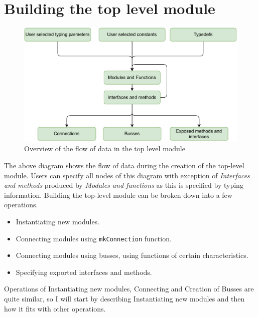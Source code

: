 \documentclass[12pt]{report}
\begin{document}
\newpage
\section{Building the top level module}
\begin{figure}[!h]
    \centering
    \caption{Overview of the flow of data in the top level module}

    \includegraphics[width=1.0\columnwidth]{pdfExports/LargeMap-dataFlow.drawio.pdf}
\end{figure}
The above diagram shows the flow of data during the creation of the top-level module. Users can specify all nodes of this diagram with exception of \emph{Interfaces and methods} produced by \emph{Modules and functions} as this is specified by typing information. 
Building the top-level module can be broken down into a few operations. 
\begin{itemize} 
   \item Instantiating new modules. 
   \item Connecting modules using \verb!mkConnection! function. 
   \item Connecting modules using busses, using functions of certain characteristics. 
   \item Specifying exported interfaces and methods. 
\end{itemize}  
Operations of Instantiating new modules, Connecting and Creation of Busses are quite similar, so I will start by describing Instantiating new modules and then how it fits with other operations. 
\end{document}
